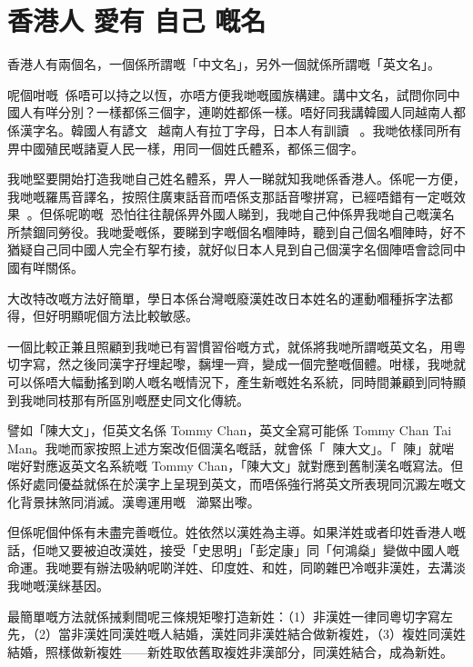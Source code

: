 \section{香港人 愛有 自己 嘅名}
香港人有兩個名，一個係所謂嘅「中文名」，另外一個就係所謂嘅「英文名」。

呢個咁嘅係唔可以持之以恆，亦唔方便我哋嘅國族構建。講中文名，試問你同中國人有咩分別？一樣都係三個字，連啲姓都係一樣。唔好同我講韓國人同越南人都係漢字名。韓國人有諺文󱼙，越南人有拉丁字母，日本人有訓讀。我哋依樣同所有畀中國殖民嘅諸夏人民一樣，用同一個姓氏體系，都係三個字。

我哋堅要開始打造我哋自己姓名體系，畀人一睇就知我哋係香港人。係呢一方便，我哋嘅羅馬音譯名，按照住廣東話音而唔係支那話音嚟拼寫，已經唔錯有一定嘅效果。但係呢啲嘅恐怕往往靚係畀外國人睇到，我哋自己仲係畀我哋自己嘅漢名所禁錮同勞役。我哋愛嘅係，要睇到字嘅個名嗰陣時，聽到自己個名嗰陣時，好不猶疑自己同中國人完全冇挐冇掕，就好似日本人見到自己個漢字名個陣唔會諗同中國有咩關係。

大改特改嘅方法好簡單，學日本係台灣嘅廢漢姓改日本姓名的運動嗰種拆字法都得，但好明顯呢個方法比較敏感。

一個比較正兼且照顧到我哋已有習慣習俗嘅方式，就係將我哋所謂嘅英文名，用粵切字寫，然之後同漢字孖埋起嚟，黐埋一齊，變成一個完整嘅個體。咁樣，我哋就可以係唔大幅動搖到啲人嘅名嘅情況下，產生新嘅姓名系統，同時間兼顧到同特顯到我哋同枝那有所區別嘅歷史同文化傳統。

譬如「陳大文」，佢英文名係 Tommy Chan，英文全寫可能係 Tommy Chan Tai Man。我哋而家按照上述方案改佢個漢名嘅話，就會係「陳大文」。「陳」就啱啱好對應返英文名系統嘅 Tommy Chan，「陳大文」就對應到舊制漢名嘅寫法。但係好處同優益就係在於漢字上呈現到英文，而唔係強行將英文所表現同沉澱左嘅文化背景抹煞同消滅。漢粵運用嘅瀄緊出嚟。

但係呢個仲係有未盡完善嘅位。姓依然以漢姓為主導。如果洋姓或者印姓香港人嘅話，佢哋又要被迫改漢姓，接受「史思明」「彭定康」同「何鴻燊」變做中國人嘅命運。我哋要有辦法吸納呢啲洋姓、印度姓、和姓，同啲雜巴冷嘅非漢姓，去溝淡我哋嘅漢䋛基因。

最簡單嘅方法就係𢬿剩間呢三條規矩嚟打造新姓：（1）非漢姓一律同粵切字寫左先，（2）當非漢姓同漢姓嘅人結婚，漢姓同非漢姓結合做新複姓，（3）複姓同漢姓結婚，照樣做新複姓——新姓取依舊取複姓非漢部分，同漢姓結合，成為新姓。

